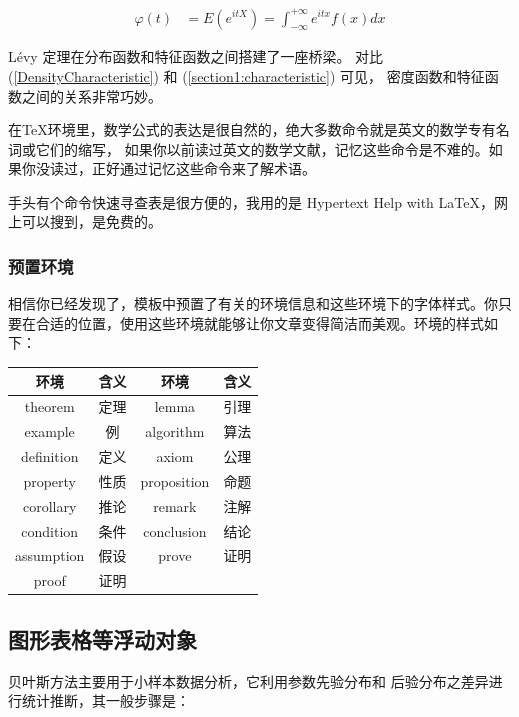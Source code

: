 \begin{align}
 \label{section1:characteristic}   %
 \varphi(t)&= E(e^{itX})=\int^{+\infty}_{-\infty} e^{itx} f(x)dx
\end{align}

L\'{e}vy 定理在分布函数和特征函数之间搭建了一座桥梁。
对比 (\ref{DensityCharacteristic}) 和 (\ref{section1:characteristic}) 可见，
密度函数和特征函数之间的关系非常巧妙。

                                                                                                                 
\attention 在\TeX 环境里，数学公式的表达是很自然的，绝大多数命令就是英文的数学专有名词或它们的缩写，
如果你以前读过英文的数学文献，记忆这些命令是不难的。如果你没读过，正好通过记忆这些命令来了解术语。


手头有个命令快速寻查表是很方便的，我用的是 Hypertext Help with \LaTeX ，网上可以搜到，是免费的。
\subsubsection{预置环境}
相信你已经发现了，模板中预置了有关的环境信息和这些环境下的字体样式。你只要在合适的位置，使用这些环境就能够让你文章变得简洁而美观。环境的样式如下：
\begin{center}

\begin{tabular}{c|c|c|c}
\hline\hline
环境 & 含义 & 环境& 含义\\\hline\hline

theorem &定理&lemma &引理  \\\hline
example &例&algorithm &算法  \\\hline
definition &定义  &axiom &公理  \\\hline
property &性质  &proposition &命题 \\\hline
corollary& 推论 &remark &注解  \\\hline
condition &条件  &conclusion &结论  \\\hline
assumption &假设  &prove &证明 \\\hline
proof&证明 &&\\ \hline\hline
\end{tabular}

\end{center}
\subsection{图形表格等浮动对象}
贝叶斯方法主要用于小样本数据分析，它利用参数先验分布和
后验分布之差异进行统计推断，其一般步骤是：

